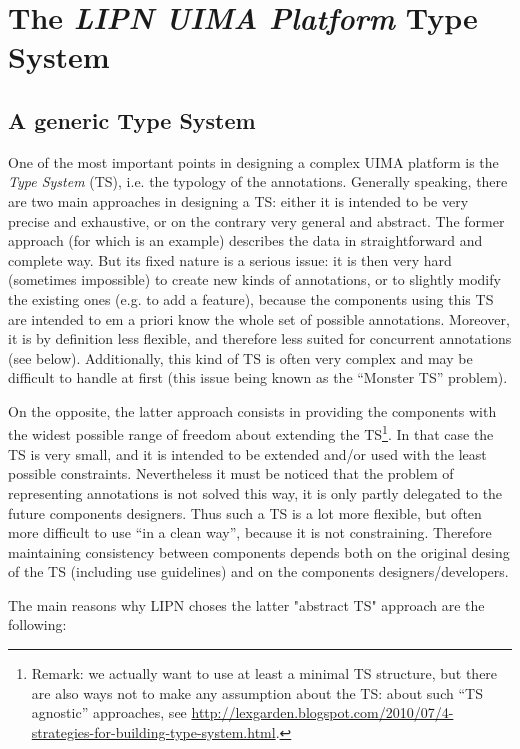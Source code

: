 \documentclass{article}
\newcommand{\softName}{{\em LIPN UIMA Platform}\xspace}
\begin{document}
\section{The \softName Type System}
\label{partTypeSystem}

\subsection{A generic Type System}
\label{partGenericTS}
One of the most important points in designing a complex UIMA platform is the {\em Type System} (TS), i.e. the typology of the annotations. Generally speaking, there are two main approaches in designing a TS: either it is intended to be very precise and exhaustive, or on the contrary very general and abstract. The former approach (for which \cite{HBTPMTA07A} is an example) describes the data in straightforward and complete way. But its fixed nature is a serious issue: it is then very hard (sometimes impossible) to create new kinds of annotations, or to slightly modify the existing ones (e.g. to add a feature), because the components using this TS are intended to {em a priori} know the whole set of possible annotations. Moreover, it is by definition less flexible, and therefore less suited for concurrent annotations (see below). Additionally, this kind of TS is often very complex and may be difficult to handle at first (this issue being known as the ``Monster TS'' problem).

On the opposite, the latter approach consists in providing the components with the widest possible range of freedom about extending the TS\footnote{Remark: we actually want to use at least a minimal TS structure, but there are also ways not to make any assumption about the TS: about such ``TS agnostic'' approaches, see \url{http://lexgarden.blogspot.com/2010/07/4-strategies-for-building-type-system.html}.}. In that case the TS is very small, and it is intended to be extended and/or used with the least possible constraints. Nevertheless it must be noticed that the problem of representing annotations is not solved this way, it is only partly delegated to  the future components designers. Thus such a TS is a lot more flexible, but often more difficult to use ``in a clean way'', because it is not constraining. Therefore maintaining consistency between components depends both on the original desing of the TS (including use guidelines) and on the components designers/developers.


The main reasons why LIPN choses the latter "abstract TS" approach are the following:
\end{document}
